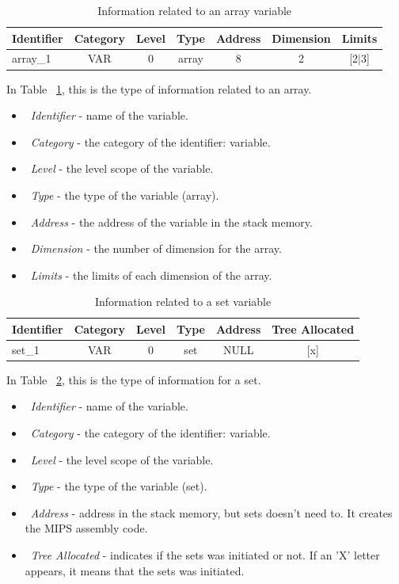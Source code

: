 \documentclass[
  oneside,
  11pt, a4paper,
  footinclude=true,
  headinclude=true,
  cleardoublepage=empty
]{scrbook}
\begin{document}
\begin{table}[h!]
\centering
\caption{Information related to an array variable}
\label{tbl:var_array_information}
\begin{tabular}{l|c|c|c|c|l|l}
\multicolumn{1}{c|}{Identifier} & Category & Level & Type    & Address & Dimension              & Limits                        \\ \hline
array\_1                        & VAR      & 0     & array & 8       & \multicolumn{1}{c|}{2} & \multicolumn{1}{c}{{[}2$|$3{]}}
\end{tabular}
\end{table}

In Table ~\ref{tbl:var_array_information}, this is the type of information related to an array.
\begin{itemize}
\item ~\textit{Identifier} - name of the variable.
\item ~\textit{Category} - the category of the identifier: variable.
\item ~\textit{Level} - the level scope of the variable.
\item ~\textit{Type} - the type of the variable (array).
\item ~\textit{Address} - the address of the variable in the stack memory.
\item ~\textit{Dimension} - the number of dimension for the array.
\item ~\textit{Limits} - the limits of each dimension of the array.
\end{itemize}

\begin{table}[h!]
\centering
\caption{Information related to a set variable}
\label{tbl:var_set_information}
\begin{tabular}{l|c|c|c|c|l}
\multicolumn{1}{c|}{Identifier} & Category & Level & Type    & Address & Tree Allocated              \\ \hline
set\_1                          & VAR      & 0     & set & NULL     & \multicolumn{1}{c}{{[}x{]}}
\end{tabular}
\end{table}

In Table ~\ref{tbl:var_set_information}, this is the type of information for a set.
\begin{itemize}
\item ~\textit{Identifier} - name of the variable.
\item ~\textit{Category} - the category of the identifier: variable.
\item ~\textit{Level} - the level scope of the variable.
\item ~\textit{Type} - the type of the variable (set).
\item ~\textit{Address} - address in the stack memory, but sets doesn't need to. It creates the MIPS assembly code.
\item ~\textit{Tree Allocated} - indicates if the sets was initiated or not. If an 'X' letter appears, it means that the sets was initiated.
\end{itemize}
\end{document}

